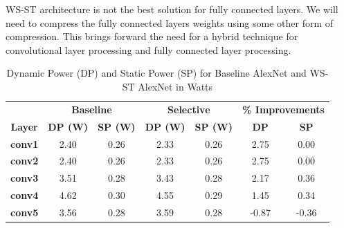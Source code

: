 \documentclass[conference]{IEEEtran}
\begin{document}
WS-ST architecture is not the best solution for fully connected layers. We will need to compress the fully connected layers weights using some other form of compression. This brings forward the need for a hybrid technique for convolutional layer processing and fully connected layer processing. 

\begin{table}[!ht]
\centering
\caption{Dynamic Power (DP) and Static Power (SP) for Baseline AlexNet and WS-ST AlexNet in Watts}
\label{DPSP}
\begin{tabular}{ccccccc}
\hline
               & \multicolumn{2}{c}{\textbf{Baseline}}          & \multicolumn{2}{c}{\textbf{Selective}}         & \multicolumn{2}{c}{\textbf{\% Improvements}}   \\ 
\textbf{Layer} & \textbf{DP (W)} & \textbf{SP (W)} & \textbf{DP (W)} & \textbf{SP (W)} & \textbf{DP} & \textbf{SP} \\ \hline
\textbf{conv1} & 2.40                   & 0.26                  & 2.33                   & 0.26                  & 2.75                   & 0.00                  \\
\textbf{conv2} & 2.40                   & 0.26                  & 2.33                   & 0.26                  & 2.75                   & 0.00                  \\
\textbf{conv3} & 3.51                   & 0.28                  & 3.43                   & 0.28                  & 2.17                   & 0.36                  \\
\textbf{conv4} & 4.62                   & 0.30                  & 4.55                   & 0.29                  & 1.45                   & 0.34                  \\
\textbf{conv5} & 3.56                   & 0.28                  & 3.59                   & 0.28                  & -0.87                  & -0.36                 \\ \hline
\end{tabular}
\end{table}
\end{document}
